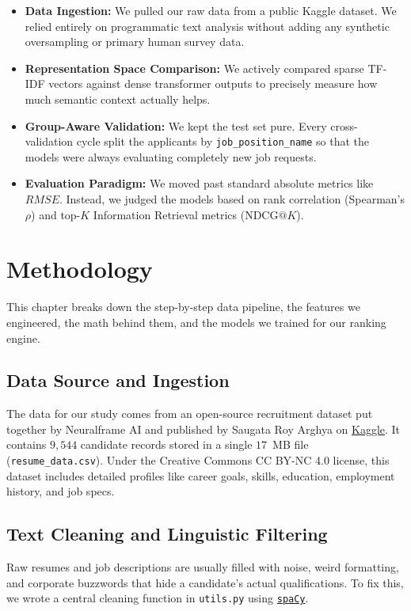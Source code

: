 \documentclass[12pt,a4paper,oneside]{report}
\begin{document}
\begin{itemize}
    \item \textbf{Data Ingestion:} We pulled our raw data from a public Kaggle dataset. We relied entirely on programmatic text analysis without adding any synthetic oversampling or primary human survey data.
    
    \item \textbf{Representation Space Comparison:} We actively compared sparse TF-IDF vectors against dense transformer outputs to precisely measure how much semantic context actually helps.

    \item \textbf{Group-Aware Validation:} We kept the test set pure. Every cross-validation cycle split the applicants by \texttt{job\_position\_name} so that the models were always evaluating completely new job requests.

    \item \textbf{Evaluation Paradigm:} We moved past standard absolute metrics like $RMSE$. Instead, we judged the models based on rank correlation (Spearman's $\rho$) and top-$K$ Information Retrieval metrics ($\text{NDCG}@K$).
\end{itemize}


\chapter{Methodology}

This chapter breaks down the step-by-step data pipeline, the features we engineered, the math behind them, and the models we trained for our ranking engine.

\section{Data Source and Ingestion}
The data for our study comes from an open-source recruitment dataset put together by Neuralframe AI and published by Saugata Roy Arghya on \href{https://www.kaggle.com/datasets/saugataroyarghya/resume-dataset}{Kaggle}. It contains $9,544$ candidate records stored in a single $17$~MB file (\texttt{resume\_data.csv}). Under the Creative Commons CC BY-NC 4.0 license, this dataset includes detailed profiles like career goals, skills, education, employment history, and job specs.

\section{Text Cleaning and Linguistic Filtering}
Raw resumes and job descriptions are usually filled with noise, weird formatting, and corporate buzzwords that hide a candidate's actual qualifications. To fix this, we wrote a central cleaning function in \texttt{utils.py} using \href{https://spacy.io/}{\texttt{spaCy}}.
\end{document}

